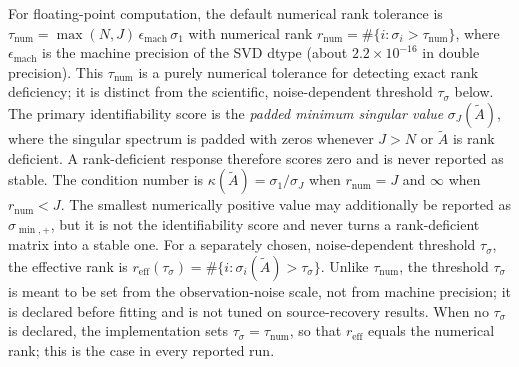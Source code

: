 For floating-point computation, the default numerical rank tolerance is
\(\tau_{\mathrm{num}}=\max(N,J)\,\epsilon_{\mathrm{mach}}\,\sigma_1\) with
numerical rank \(r_{\mathrm{num}}=\#\{i:\sigma_i>\tau_{\mathrm{num}}\}\),
where \(\epsilon_{\mathrm{mach}}\) is the machine precision of the SVD dtype
(about \(2.2\times10^{-16}\) in double precision).  This
\(\tau_{\mathrm{num}}\) is a purely numerical tolerance for detecting exact rank
deficiency; it is distinct from the scientific, noise-dependent threshold
\(\tau_\sigma\) below.  The primary identifiability score is the
\emph{padded minimum singular value} \(\sigma_J(\widetilde A)\), where the
singular spectrum is padded with zeros whenever \(J>N\) or
\(\widetilde A\) is rank deficient.  A rank-deficient response therefore
scores zero and is never reported as stable.
The condition number is \(\kappa(\widetilde A)=\sigma_1/\sigma_J\) when
\(r_{\mathrm{num}}=J\) and \(\infty\) when \(r_{\mathrm{num}}<J\).
The smallest numerically positive value may additionally be reported as
\(\sigma_{\min,+}\), but it is not the identifiability score and never turns a
rank-deficient matrix into a stable one.  For a separately chosen,
noise-dependent threshold \(\tau_\sigma\), the effective rank is
\(r_{\mathrm{eff}}(\tau_\sigma)
=\#\{i:\sigma_i(\widetilde A)>\tau_\sigma\}\).
Unlike \(\tau_{\mathrm{num}}\), the threshold \(\tau_\sigma\) is meant to be set
from the observation-noise scale, not from machine precision; it is declared before
fitting and is not tuned on source-recovery results.  When no \(\tau_\sigma\) is
declared, the implementation sets \(\tau_\sigma=\tau_{\mathrm{num}}\), so that
\(r_{\mathrm{eff}}\) equals the numerical rank; this is the case in every reported
run.

